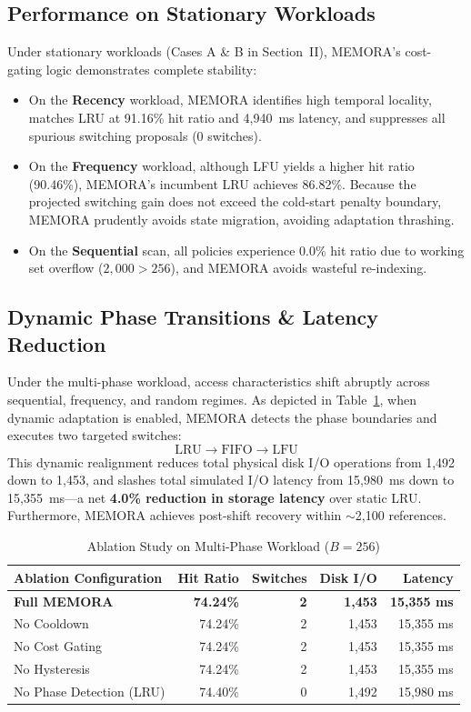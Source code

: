 \documentclass[conference]{IEEEtran}
\begin{document}
\subsection{Performance on Stationary Workloads}
Under stationary workloads (Cases A \& B in Section~II), MEMORA's cost-gating logic demonstrates complete stability:
\begin{itemize}
    \item On the \textbf{Recency} workload, MEMORA identifies high temporal locality, matches LRU at 91.16\% hit ratio and 4,940~ms latency, and suppresses all spurious switching proposals (0 switches).
    \item On the \textbf{Frequency} workload, although LFU yields a higher hit ratio (90.46\%), MEMORA's incumbent LRU achieves 86.82\%. Because the projected switching gain does not exceed the cold-start penalty boundary, MEMORA prudently avoids state migration, avoiding adaptation thrashing.
    \item On the \textbf{Sequential} scan, all policies experience 0.0\% hit ratio due to working set overflow ($2{,}000 > 256$), and MEMORA avoids wasteful re-indexing.
\end{itemize}

\subsection{Dynamic Phase Transitions \& Latency Reduction}
Under the multi-phase workload, access characteristics shift abruptly across sequential, frequency, and random regimes. As depicted in Table~\ref{tab:ablation}, when dynamic adaptation is enabled, MEMORA detects the phase boundaries and executes two targeted switches:
\begin{equation*}
\text{LRU} \longrightarrow \text{FIFO} \longrightarrow \text{LFU}
\end{equation*}
This dynamic realignment reduces total physical disk I/O operations from 1,492 down to 1,453, and slashes total simulated I/O latency from 15,980~ms down to 15,355~ms---a net \textbf{4.0\% reduction in storage latency} over static LRU. Furthermore, MEMORA achieves post-shift recovery within $\sim$2,100 references.

\begin{table}[t]
\centering
\caption{Ablation Study on Multi-Phase Workload ($B=256$)}
\label{tab:ablation}
\begin{tabular}{@{}lrrrr@{}}
\toprule
\textbf{Ablation Configuration} & \textbf{Hit Ratio} & \textbf{Switches} & \textbf{Disk I/O} & \textbf{Latency} \\
\midrule
\textbf{Full MEMORA} & \textbf{74.24\%} & \textbf{2} & \textbf{1,453} & \textbf{15,355 ms} \\
No Cooldown & 74.24\% & 2 & 1,453 & 15,355 ms \\
No Cost Gating & 74.24\% & 2 & 1,453 & 15,355 ms \\
No Hysteresis & 74.24\% & 2 & 1,453 & 15,355 ms \\
No Phase Detection (LRU) & 74.40\% & 0 & 1,492 & 15,980 ms \\
\bottomrule
\end{tabular}
\end{table}
\end{document}
